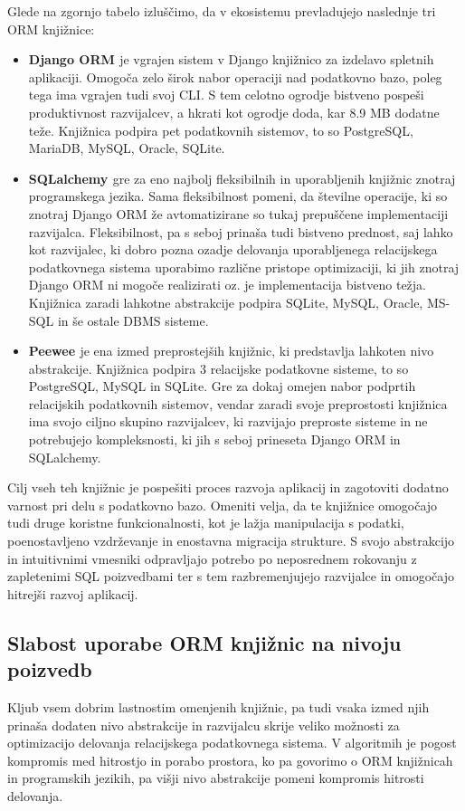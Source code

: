 \documentclass[a4paper,12pt,openright]{book}
\begin{document}
    \noindent
    Glede na zgornjo tabelo izluščimo, da v ekosistemu prevladujejo naslednje tri ORM knjižnice:
    \begin{itemize}
        \item \textbf{Django ORM \cite{DJANGO_GITHUB}} je vgrajen sistem v Django knjižnico za izdelavo spletnih aplikaciji. Omogoča zelo širok nabor operaciji nad podatkovno bazo, poleg tega ima vgrajen tudi svoj CLI. S tem celotno ogrodje bistveno pospeši produktivnost razvijalcev, a hkrati kot ogrodje doda, kar 8.9 MB dodatne teže. Knjižnica podpira pet podatkovnih sistemov, to so PostgreSQL, MariaDB, MySQL, Oracle, SQLite.
        \item \textbf{SQLalchemy \cite{SQLALCHEMY_GITHUB}} gre za eno najbolj fleksibilnih in uporabljenih knjižnic znotraj programskega jezika. Sama fleksibilnost pomeni, da številne operacije, ki so znotraj Django ORM že avtomatizirane so tukaj prepuščene implementaciji razvijalca. Fleksibilnost, pa s seboj prinaša tudi bistveno prednost, saj lahko kot razvijalec, ki dobro pozna ozadje delovanja uporabljenega relacijskega podatkovnega sistema uporabimo različne pristope optimizaciji, ki jih znotraj Django ORM ni mogoče realizirati oz. je implementacija bistveno težja. Knjižnica zaradi lahkotne abstrakcije podpira SQLite, MySQL, Oracle, MS-SQL in še ostale DBMS sisteme.
        \item \textbf{Peewee \cite{PEEWEE_GITHUB}} je ena izmed preprostejših knjižnic, ki predstavlja lahkoten nivo abstrakcije. Knjižnica podpira 3 relacijske podatkovne sisteme, to so PostgreSQL, MySQL in SQLite. Gre za dokaj omejen nabor podprtih relacijskih podatkovnih sistemov, vendar zaradi svoje preprostosti knjižnica ima svojo ciljno skupino razvijalcev, ki razvijajo preproste sisteme in ne potrebujejo kompleksnosti, ki jih s seboj prineseta Django ORM in SQLalchemy.
    \end{itemize}

    \noindent
    Cilj vseh teh knjižnic je pospešiti proces razvoja aplikacij in zagotoviti dodatno varnost pri delu s podatkovno bazo. Omeniti velja, da te knjižnice omogočajo tudi druge koristne funkcionalnosti, kot je lažja manipulacija s podatki, poenostavljeno vzdrževanje in enostavna migracija strukture. S svojo abstrakcijo in intuitivnimi vmesniki odpravljajo potrebo po neposrednem rokovanju z zapletenimi SQL poizvedbami ter s tem razbremenjujejo razvijalce in omogočajo hitrejši razvoj aplikacij.

    \subsection{Slabost uporabe ORM knjižnic na nivoju poizvedb}
    Kljub vsem dobrim lastnostim omenjenih knjižnic, pa tudi vsaka izmed njih prinaša dodaten nivo abstrakcije in razvijalcu skrije veliko možnosti za optimizacijo delovanja relacijskega podatkovnega sistema. V algoritmih je pogost kompromis med hitrostjo in porabo prostora, ko pa govorimo o ORM knjižnicah in programskih jezikih, pa višji nivo abstrakcije pomeni kompromis hitrosti delovanja.
\end{document}

